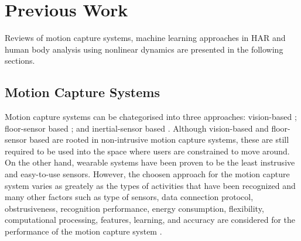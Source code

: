 \documentclass{sigchi}
\begin{document}
% 


\section{Previous Work}

Reviews of motion capture systems, 
machine learning approaches in HAR and human body analysis using 
nonlinear dynamics are presented in the following sections.


\subsection{Motion Capture Systems}
Motion capture systems can be chategorised into three approaches: 
vision-based \cite{Forsyth2005}; 
floor-sensor based
\cite{Paradiso1997,Steinhage2008,Aguilar2007,Wimmer2011,Yin2003,Moere2004,
Richardson2004,Srinivasan2005, Rangarajan2008,Visell2010, Rajalingham2010}
; and inertial-sensor based
\cite{Razak2012,Bamberg2008,Benocci2009,Xu2012,Holleczek2010}.
Although vision-based and floor-sensor based are rooted in non-intrusive 
motion capture systems, these are still required to be used into the space 
where users are constrained to move around.
On the other hand, wearable systems have been proven to be the least instrusive 
and easy-to-use sensors. However, the choosen approach for 
the motion capture system varies as greately as the 
types of activities that have been recognized 
and many other factors such as type of sensors, data connection protocol, obstrusiveness, 
recognition performance, energy consumption, flexibility, computational processing,
features, learning, and accuracy 
are considered for the performance of the motion capture system \cite{Lara2013}.
\end{document}

